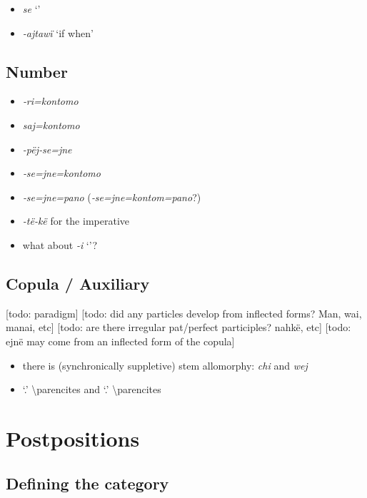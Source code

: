 \documentclass{memoir}
\begin{document}
\begin{itemize}
  \begin{itemize}
  \tightlist
  \item
    \emph{se} `'
  \item
    \emph{-ajtawï} `if when'
  \end{itemize}
\end{itemize}

\section{Number}

\begin{itemize}
\tightlist
\item
  \emph{‑ri=kontomo}
\item
  \emph{saj=kontomo}
\item
  \emph{-pëj‑se=jne}
\item
  \emph{‑se=jne=kontomo}
\item
  \emph{‑se=jne=pano} (\emph{‑se=jne=kontom=pano}?)
\item
  \emph{-të-kë} for the imperative
\item
  what about \emph{-i} `'?
\end{itemize}

\section{Copula / Auxiliary}

{[}todo: paradigm{]} {[}todo: did any particles develop from inflected
forms? Man, wai, manai, etc{]} {[}todo: are there irregular pat/perfect
participles? nahkë, etc{]} {[}todo: ejnë may come from an inflected form
of the copula{]}

\begin{itemize}
\tightlist
\item
  there is (synchronically suppletive) stem allomorphy: \emph{chi} and
  \emph{wej}
\item
   `.' \textbackslash parencites and
   `.' \textbackslash parencites
\end{itemize}

\chapter{\texorpdfstring{Postpositions \label{postp}}{Postpositions }}

\section{Defining the category}
\end{document}
